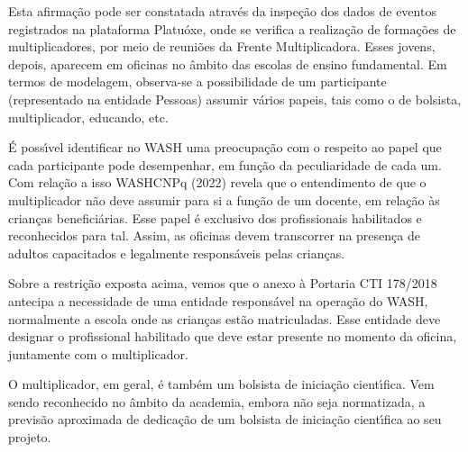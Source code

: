 \documentclass[
12pt,		%
openright,	%
twoside,  %
a4paper,			%
chapter=TITLE,		%
english,			%
french,				%
spanish,			%
brazil				%
]{USPSC-classe/USPSC}
\begin{document}
Esta afirma\c{c}\~ao pode ser constatada atrav\'es da inspe\c{c}\~ao dos dados de eventos registrados na plataforma Platu\'oxe, onde se verifica a realiza\c{c}\~ao de forma\c{c}\~oes de multiplicadores, por meio de reuni\~oes da Frente Multiplicadora. Esses jovens, depois, aparecem em oficinas no \^ambito das escolas de ensino fundamental. Em termos de modelagem, observa-se a possibilidade de um participante (representado na entidade \textquotedbl Pessoas\textquotedbl ) assumir v\'arios papeis, tais como o de bolsista, multiplicador, educando, etc.









\'E poss\'{\i}vel identificar no WASH uma preocupa\c{c}\~ao com o respeito ao papel que cada participante pode desempenhar, em fun\c{c}\~ao da peculiaridade de cada um. Com rela\c{c}\~ao a isso WASHCNPq (2022) revela que o entendimento de que o multiplicador n\~ao deve assumir para si a fun\c{c}\~ao de um docente, em rela\c{c}\~ao \`as crian\c{c}as benefici\'arias. Esse papel \'e exclusivo dos profissionais habilitados e reconhecidos para tal. Assim,  as oficinas devem transcorrer na presen\c{c}a de adultos capacitados e legalmente respons\'aveis pelas crian\c{c}as.









Sobre a restri\c{c}\~ao exposta acima, vemos que o anexo \`a Portaria CTI 178/2018 antecipa a necessidade de uma entidade respons\'avel na opera\c{c}\~ao do WASH, normalmente a escola onde as crian\c{c}as est\~ao matriculadas. Esse entidade deve designar o profissional habilitado que deve estar presente no momento da oficina, juntamente com o multiplicador.









O multiplicador, em geral, \'e tamb\'em um bolsista de inicia\c{c}\~ao cient\'{\i}fica. Vem sendo reconhecido no \^ambito da academia, embora n\~ao seja normatizada, a previs\~ao aproximada de dedica\c{c}\~ao de um bolsista de inicia\c{c}\~ao cient\'{\i}fica ao seu projeto.
\end{document}
